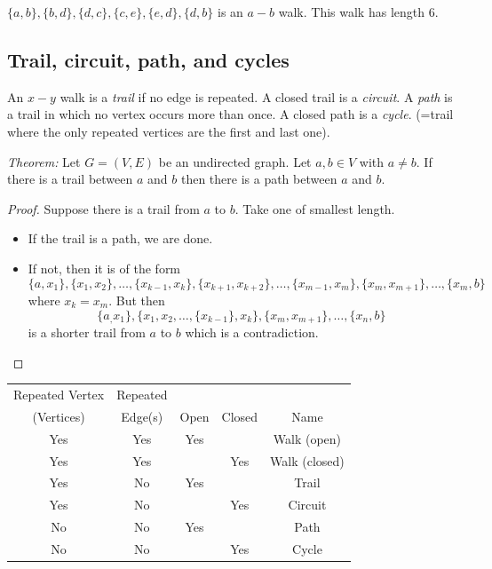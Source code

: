 \documentclass[11pt]{article}
\begin{document}
    \(\{a,b\},\{b,d\}, \{d,c\}, \{c,e\}, \{e,d\}, \{d,b\}\) is an \(a-b\) walk. This walk has length 6.

    \subsection{Trail, circuit, path, and cycles}
 
    An \(x-y\) walk is a \emph{trail} if no edge is repeated. A closed trail is a \emph{circuit}. A \emph{path} is a trail in which no vertex occurs more than once. A closed path is a \emph{cycle}. (=trail where the only repeated vertices are the first and last one). 

    \vspace{1em}

    \emph{Theorem:} Let \(G = (V,E)\) be an undirected graph. Let \(a,b \in V\) with \(a \neq b\). If there is a trail between $a$ and $b$ then there is a path between $a$ and $b$.

    \begin{proof}
        Suppose there is a trail from $a$ to $b$. Take one of smallest length.
        \begin{itemize}
            \item If the trail is a path, we are done.
            \item If not, then it is of the form \[\{a,x_1\}, \{x_1, x_2\}, \dots,  \{x_{k-1}, x_k\}, \{x_{k+1}, x_{k+2}\}, \dots, \{x_{m-1}, x_m\}, \{x_m, x_{m+1}\}, \dots, \{x_m, b\}\] where \(x_k = x_m\). But then \[\{a_, x_1\}, \{x_1, x_2, \dots, \{x_{k-1}\}, x_k\}, \{x_m, x_{m+1}\}, \dots, \{x_n,b\}\] is a shorter trail from $a$ to $b$ which is a contradiction.
        \end{itemize}
    \end{proof}

    \begin{center}
        \begin{tabular}{| c | c | c | c | c |} \hline
            Repeated Vertex & Repeated & & & \\ 
            (Vertices) & Edge(s) & Open & Closed & Name \\ \hline
            Yes & Yes & Yes & & Walk (open) \\
            Yes & Yes & & Yes & Walk (closed) \\
            Yes & No & Yes & & Trail \\
            Yes & No & & Yes & Circuit \\
            No & No & Yes & & Path \\
            No & No & & Yes & Cycle \\ \hline
        \end{tabular}
    \end{center}
\end{document}

